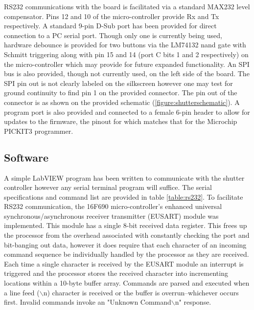 RS232 communications with the board is facilitated via a standard MAX232 level compensator.  Pins 12 and 10 of the micro-controller provide Rx and Tx respectively.  A standard 9\--pin D\--Sub port has been provided for direct connection to a PC serial port.  Though only one is currently being used, hardware debounce is provided for two buttons via the LM74132 nand gate with Schmitt triggering along with pin 15 and 14 (port C bits 1 and 2 respectively) on the micro-controller which may provide for future expanded functionality.  An SPI bus is also provided, though not currently used, on the left side of the board.  The SPI pin out is not clearly labeled on the silkscreen however one may test for ground continuity to find pin 1 on the provided connector.  The pin out of the connector is as shown on the provided schematic (\fig \ref{figure:shutterschematic}).  A program port is also provided and connected to a female 6-pin header to allow for updates to the firmware, the pinout for which matches that for the Microchip PICKIT3 programmer.

\subsection{Software}
A simple LabVIEW program has been written to communicate with the shutter controller however any serial terminal program will suffice.  The serial specifications and command list are provided in table \ref{table:rs232}.  To facilitate RS232 communication, the 16F690 micro-controller's enhanced universal synchronous/asynchronous receiver transmitter (EUSART) module was implemented.  This module has a single 8-bit received data register.  This frees up the processor from the overhead associated with constantly checking the port and bit\--banging out data, however it does require that each character of an incoming command sequence be individually handled by the processor as they are received.  Each time a single character is received by the EUSART module an interrupt is triggered and the processor stores the received character into incrementing locations within a 10\--byte buffer array.  Commands are parsed and executed when a line feed ($\backslash$n) character is received or the buffer is overrun\---whichever occurs first.  Invalid commands invoke an "Unknown Command$\backslash$n" response.

